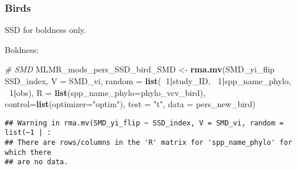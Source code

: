 \documentclass[]{article}
\newenvironment{Shaded}{\begin{snugshade}}{\end{snugshade}}
\newcommand{\KeywordTok}[1]{\textcolor[rgb]{0.13,0.29,0.53}{\textbf{#1}}}
\newcommand{\DataTypeTok}[1]{\textcolor[rgb]{0.13,0.29,0.53}{#1}}
\newcommand{\DecValTok}[1]{\textcolor[rgb]{0.00,0.00,0.81}{#1}}
\newcommand{\StringTok}[1]{\textcolor[rgb]{0.31,0.60,0.02}{#1}}
\newcommand{\CommentTok}[1]{\textcolor[rgb]{0.56,0.35,0.01}{\textit{#1}}}
\newcommand{\OperatorTok}[1]{\textcolor[rgb]{0.81,0.36,0.00}{\textbf{#1}}}
\newcommand{\NormalTok}[1]{#1}
\begin{document}
\subsubsection{Birds}\label{birds}

SSD for boldness only.

\begin{Shaded}
\end{Shaded}

Boldness:

\begin{Shaded}
\begin{Highlighting}[]
    \CommentTok{# SMD}
\NormalTok{    MLMR_mods_pers_SSD_bird_SMD <-}\StringTok{ }\KeywordTok{rma.mv}\NormalTok{(SMD_yi_flip }\OperatorTok{~}\StringTok{ }\NormalTok{SSD_index, }\DataTypeTok{V =}\NormalTok{ SMD_vi, }
                                          \DataTypeTok{random =} \KeywordTok{list}\NormalTok{(}\OperatorTok{~}\DecValTok{1}\OperatorTok{|}\NormalTok{study_ID, }\OperatorTok{~}\DecValTok{1}\OperatorTok{|}\NormalTok{spp_name_phylo, }\OperatorTok{~}\DecValTok{1}\OperatorTok{|}\NormalTok{obs), }
                                          \DataTypeTok{R =} \KeywordTok{list}\NormalTok{(}\DataTypeTok{spp_name_phylo=}\NormalTok{phylo_vcv_bird), }\DataTypeTok{control=}\KeywordTok{list}\NormalTok{(}\DataTypeTok{optimizer=}\StringTok{"optim"}\NormalTok{), }
                                          \DataTypeTok{test =} \StringTok{"t"}\NormalTok{, }\DataTypeTok{data =}\NormalTok{ pers_new_bird)}
\end{Highlighting}
\end{Shaded}

\begin{verbatim}
## Warning in rma.mv(SMD_yi_flip ~ SSD_index, V = SMD_vi, random = list(~1 | :
## There are rows/columns in the 'R' matrix for 'spp_name_phylo' for which there
## are no data.
\end{verbatim}
\end{document}
